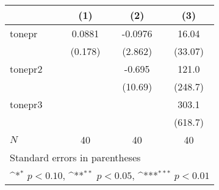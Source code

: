 {
\def\sym#1{\ifmmode^{#1}\else\(^{#1}\)\fi}
\begin{tabular}{l*{3}{c}}
\hline\hline
            &\multicolumn{1}{c}{(1)}         &\multicolumn{1}{c}{(2)}         &\multicolumn{1}{c}{(3)}         \\
\hline
tonepr      &      0.0881         &     -0.0976         &       16.04         \\
            &     (0.178)         &     (2.862)         &     (33.07)         \\
[1em]
tonepr2     &                     &      -0.695         &       121.0         \\
            &                     &     (10.69)         &     (248.7)         \\
[1em]
tonepr3     &                     &                     &       303.1         \\
            &                     &                     &     (618.7)         \\
\hline
\(N\)       &          40         &          40         &          40         \\
\hline\hline
\multicolumn{4}{l}{\footnotesize Standard errors in parentheses}\\
\multicolumn{4}{l}{\footnotesize \sym{*} \(p<0.10\), \sym{**} \(p<0.05\), \sym{***} \(p<0.01\)}\\
\end{tabular}
}
